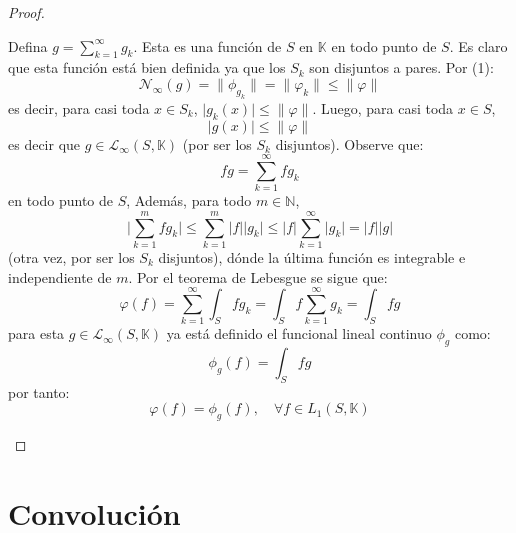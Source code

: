 \documentclass[12pt]{report}
\theoremstyle{largebreak}
\newcommand\abs[1]{\ensuremath{\big|#1\big|}}
\newcommand\norm[1]{\ensuremath{\|#1\|}}
\newcommand{\N}[2]{\ensuremath{\mathcal{N}_{#1}\left(#2\right)}}
\begin{document}
\begin{proof}
\begin{enumerate}
\begin{equation*}
            \end{equation*}
            Defina $g=\sum_{ k=1}^{\infty}g_k$. Esta es una función de $S$ en $\mathbb{K}$ en todo punto de $S$. Es claro que esta función está bien definida ya que los $S_k$ son disjuntos a pares. Por (1):
            \begin{equation*}
                \N{\infty}{g}=\norm{\phi_{g_k}}=\norm{\varphi_k}\leq\norm{\varphi}
            \end{equation*}
            es decir, para casi toda $x\in S_k$, $\abs{g_k(x)}\leq\norm{\varphi}$. Luego, para casi toda $x\in S$,
            \begin{equation*}
                \abs{g(x)}\leq \norm{\varphi}
            \end{equation*}
            es decir que $g\in\mathcal{L}_\infty(S,\mathbb{K})$ (por ser los $S_k$ disjuntos). Observe que:
            \begin{equation*}
                fg=\sum_{ k=1}^{\infty}fg_k
            \end{equation*}
            en todo punto de $S$, Además, para todo $m\in\mathbb{N}$,
            \begin{equation*}
                \abs{\sum_{ k=1}^{m}fg_k}\leq\sum_{ k=1}^{m}\abs{f}\abs{g_k}\leq \abs{f}\sum_{ k=1}^{\infty}\abs{g_k}=\abs{f}\abs{g}
            \end{equation*}
            (otra vez, por ser los $S_k$ disjuntos), dónde la última función es integrable e independiente de $m$. Por el teorema de Lebesgue se sigue que:
            \begin{equation*}
                \varphi(f)=\sum_{ k=1}^{\infty}\int_Sfg_k=\int_Sf\sum_{ k=1}^{\infty}g_k=\int_Sfg
            \end{equation*}
            para esta $g\in\mathcal{L}_\infty(S,\mathbb{K})$ ya está definido el funcional lineal continuo $\phi_g$ como:
            \begin{equation*}
                \phi_g(f)=\int_Sfg
            \end{equation*}
            por tanto:
            \begin{equation*}
                \varphi(f)=\phi_g(f),\quad\forall f\in L_1(S,\mathbb{K})
            \end{equation*}
        \end{enumerate}
    \end{proof}

    \chapter{Convolución}
    
\end{document}
